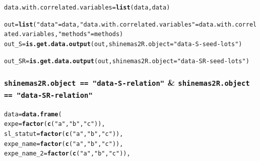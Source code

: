 \documentclass{article}\usepackage[]{graphicx}\usepackage[]{color}
\makeatletter
\newcommand{\hlstr}[1]{\textcolor[rgb]{0.192,0.494,0.8}{#1}}%
\newcommand{\hlstd}[1]{\textcolor[rgb]{0.345,0.345,0.345}{#1}}%
\newcommand{\hlkwb}[1]{\textcolor[rgb]{0.69,0.353,0.396}{#1}}%
\newcommand{\hlkwc}[1]{\textcolor[rgb]{0.333,0.667,0.333}{#1}}%
\newcommand{\hlkwd}[1]{\textcolor[rgb]{0.737,0.353,0.396}{\textbf{#1}}}%
\newenvironment{kframe}{%
 \def\at@end@of@kframe{}%
 \ifinner\ifhmode%
  \def\at@end@of@kframe{\end{minipage}}%
  \begin{minipage}{\columnwidth}%
 \fi\fi%
 \def\FrameCommand##1{\hskip\@totalleftmargin \hskip-\fboxsep
 \colorbox{shadecolor}{##1}\hskip-\fboxsep
     \hskip-\linewidth \hskip-\@totalleftmargin \hskip\columnwidth}%
 \MakeFramed {\advance\hsize-\width
   \@totalleftmargin\z@ \linewidth\hsize
   \@setminipage}}%
 {\par\unskip\endMakeFramed%
 \at@end@of@kframe}
\newenvironment{knitrout}{}{} %
\makeatother
\begin{document}
\begin{appendices}
\begin{knitrout}
\begin{kframe}
\begin{alltt}
\hlstd{data.with.correlated.variables} \hlkwb{=} \hlkwd{list}\hlstd{(data, data)}

\hlstd{out} \hlkwb{=} \hlkwd{list}\hlstd{(}\hlstr{"data"} \hlstd{= data,} \hlstr{"data.with.correlated.variables"} \hlstd{= data.with.correlated.variables,} \hlstr{"methods"} \hlstd{= methods)}
\hlstd{out_S} \hlkwb{=} \hlkwd{is.get.data.output}\hlstd{(out,} \hlkwc{shinemas2R.object} \hlstd{=} \hlstr{"data-S-seed-lots"}\hlstd{)}
\end{alltt}


{\ttfamily\noindent\itshape{}}\begin{alltt}
\hlstd{out_SR} \hlkwb{=} \hlkwd{is.get.data.output}\hlstd{(out,} \hlkwc{shinemas2R.object} \hlstd{=} \hlstr{"data-SR-seed-lots"}\hlstd{)}
\end{alltt}


{\ttfamily\noindent\itshape{}}\end{kframe}
\end{knitrout}


\subsubsection{\texttt{shinemas2R.object == "data-S-relation"} \& \texttt{shinemas2R.object == "data-SR-relation"}}

\begin{knitrout}
\color{fgcolor}\begin{kframe}
\begin{alltt}
\hlstd{data} \hlkwb{=} \hlkwd{data.frame}\hlstd{(}
        \hlkwc{expe} \hlstd{=} \hlkwd{factor}\hlstd{(}\hlkwd{c}\hlstd{(}\hlstr{"a"}\hlstd{,} \hlstr{"b"}\hlstd{,} \hlstr{"c"}\hlstd{)),}
        \hlkwc{sl_statut} \hlstd{=} \hlkwd{factor}\hlstd{(}\hlkwd{c}\hlstd{(}\hlstr{"a"}\hlstd{,} \hlstr{"b"}\hlstd{,} \hlstr{"c"}\hlstd{)),}
        \hlkwc{expe_name} \hlstd{=} \hlkwd{factor}\hlstd{(}\hlkwd{c}\hlstd{(}\hlstr{"a"}\hlstd{,} \hlstr{"b"}\hlstd{,} \hlstr{"c"}\hlstd{)),}
        \hlkwc{expe_name_2} \hlstd{=} \hlkwd{factor}\hlstd{(}\hlkwd{c}\hlstd{(}\hlstr{"a"}\hlstd{,} \hlstr{"b"}\hlstd{,} \hlstr{"c"}\hlstd{)),}


\end{alltt}
\end{kframe}
\end{knitrout}
\end{appendices}
\end{document}
